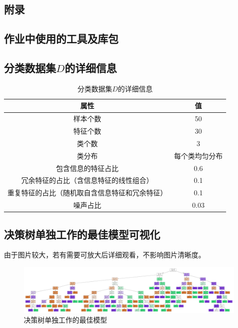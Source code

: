 \documentclass[12pt,a4paper]{article}
\theoremstyle{definition}
\begin{document}
\newpage
\begin{appendix}
	\section{附录}
	\subsection{作业中使用的工具及库包}
	\label{apd:tools}
	
	\subsection{分类数据集$D$的详细信息}
	\label{apd:dataset_para}
	\begin{table}[H]
		\renewcommand\arraystretch{1.35}
		\caption{分类数据集$D$的详细信息}
		\label{tab:dataset_para}
		\centering
		
		\begin{tabular}{c|c}
			\centering
			属性 & 值 \\
			\hline
			样本个数 & 50 \\
			特征个数 & 30 \\
			类个数 & 3 \\
			类分布 & 每个类均匀分布 \\
			包含信息的特征占比 & 0.6 \\
			冗余特征的占比（含信息特征的线性组合） & 0.1 \\
			重复特征的占比（随机取自含信息特征和冗余特征） & 0.1 \\
			噪声占比 & 0.03 \\		
		\end{tabular}
	\end{table}
	
	\subsection{决策树单独工作的最佳模型可视化}
	由于图片较大，若有需要可放大后详细观看，不影响图片清晰度。
	\label{apd:vis-tree}
	\begin{figure}[H]
		\centering
		\includegraphics[width=0.9\linewidth]{img/gs.pdf}
		\caption{决策树单独工作的最佳模型}
	\end{figure}
	
	
\end{appendix}




\end{document}
